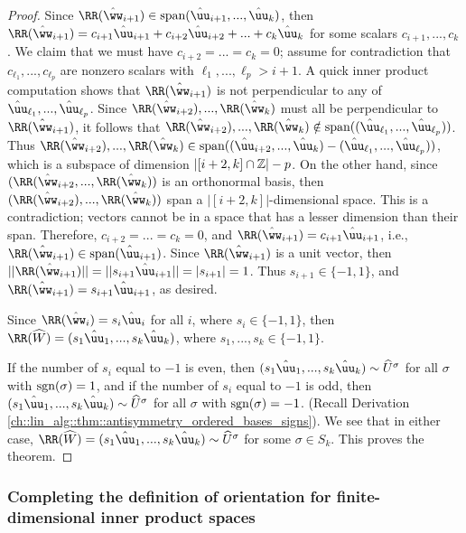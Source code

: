 \begin{proof}
    Since $\RR(\hww_{i + 1}) \in \spann(\huu_{i + 1}, ..., \huu_k)$, then $\RR(\hww_{i + 1}) = c_{i + 1} \huu_{i + 1} + c_{i + 2} \huu_{i + 2} + ... + c_k \huu_k$ for some scalars $c_{i + 1}, ..., c_k$. We claim that we must have $c_{i + 2} = ... = c_k = 0$; assume for contradiction that $c_{\ell_1}, ..., c_{\ell_p}$ are nonzero scalars with $\ell_1, ..., \ell_p > i + 1$. A quick inner product computation shows that $\RR(\hww_{i + 1})$ is not perpendicular to any of $\huu_{\ell_1}, ..., \huu_{\ell_p}$. Since $\RR(\hww_{i + 2}), ..., \RR(\hww_k)$ must all be perpendicular to $\RR(\hww_{i + 1})$, it follows that $\RR(\hww_{i + 2}), ..., \RR(\hww_k) \notin \spann((\huu_{\ell_1}, ..., \huu_{\ell_p}))$. Thus $\RR(\hww_{i + 2}), ..., \RR(\hww_k) \in \spann((\huu_{i + 2}, ..., \huu_k) - (\huu_{\ell_1}, ..., \huu_{\ell_p}))$, which is a subspace of dimension $|[i + 2, k] \cap \mathbb{Z}| - p$. On the other hand, since $(\RR(\hww_{i + 2}, ..., \RR(\hww_k))$ is an orthonormal basis, then $(\RR(\hww_{i + 2}), ..., \RR(\hww_k))$ span a $|[i + 2, k]|$-dimensional space. This is a contradiction; vectors cannot be in a space that has a lesser dimension than their span. Therefore, $c_{i + 2} = ... = c_k = 0$, and $\RR(\hww_{i + 1}) = c_{i + 1} \huu_{i + 1}$, i.e., $\RR(\hww_{i + 1}) \in \spann(\huu_{i + 1})$. Since $\RR(\hww_{i + 1})$ is a unit vector, then $||\RR(\hww_{i + 1})|| = ||s_{i + 1} \huu_{i + 1}|| = |s_{i + 1}| = 1$. Thus $s_{i + 1} \in \{-1, 1\}$, and $\RR(\hww_{i + 1}) = s_{i + 1} \huu_{i + 1}$, as desired.

    \vspace{.25cm}

    Since $\RR(\hww_i) = s_i \huu_i$ for all $i$, where $s_i \in \{-1, 1\}$, then $\RR(\hW) = (s_1 \huu_1, ..., s_k \huu_k)$, where $s_1, ..., s_k \in \{-1, 1\}$. 

    If the number of $s_i$ equal to $-1$ is even, then ${(s_1 \huu_1, ..., s_k \huu_k) \sim \hU^\sigma}$ for all $\sigma$ with $\text{sgn}(\sigma) = 1$, and if the number of $s_i$ equal to $-1$ is odd, then ${(s_1 \huu_1, ..., s_k \huu_k) \sim \hU^\sigma}$ for all $\sigma$ with $\text{sgn}(\sigma) = -1$. (Recall Derivation     \ref{ch::lin_alg::thm::antisymmetry_ordered_bases_signs}). We see that in either case, ${\RR(\hW) = (s_1 \huu_1, ..., s_k \huu_k) \sim \hU^\sigma}$ for some $\sigma \in S_k$. This proves the theorem.
\end{proof}

\subsubsection*{Completing the definition of orientation for finite-dimensional inner product spaces}

